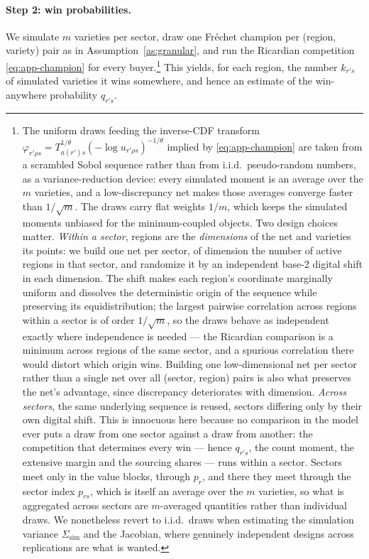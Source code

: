 \paragraph{Step 2: win probabilities.} We simulate $m$ varieties per sector, draw one Fr\'echet
champion per (region, variety) pair as in Assumption~\ref{as:granular}, and run the Ricardian
competition \eqref{eq:app-champion} for every buyer.\footnote{The uniform draws feeding the
inverse-CDF transform $\varphi_{r'\rho s}=T_{a(r')s}^{1/\theta}(-\log u_{r'\rho s})^{-1/\theta}$
implied by \eqref{eq:app-champion} are taken from a scrambled Sobol sequence rather than from
i.i.d.\ pseudo-random numbers, as a variance-reduction device: every simulated moment is an
average over the $m$ varieties, and a low-discrepancy net makes those averages converge faster
than $1/\sqrt{m}$. The draws carry flat weights $1/m$, which keeps the simulated moments
unbiased for the minimum-coupled objects. Two design choices matter. \emph{Within a sector},
regions are the \emph{dimensions} of the net and varieties its points: we build one net per
sector, of dimension the number of active regions in that sector, and randomize it by an
independent base-2 digital shift in each dimension. The shift makes each region's coordinate
marginally uniform and dissolves the deterministic origin of the sequence while preserving its
equidistribution; the largest pairwise correlation across regions within a sector is of order
$1/\sqrt{m}$, so the draws behave as independent exactly where independence is needed --- the
Ricardian comparison is a minimum across regions of the same sector, and a spurious correlation
there would distort which origin wins. Building one low-dimensional net per sector rather than a
single net over all (sector, region) pairs is also what preserves the net's advantage, since
discrepancy deteriorates with dimension. \emph{Across sectors}, the same underlying sequence is
reused, sectors differing only by their own digital shift. This is innocuous here because no
comparison in the model ever puts a draw from one sector against a draw from another: the
competition that determines every win --- hence $q_{r's}$, the count moment, the extensive
margin and the sourcing shares --- runs within a sector. Sectors meet only in the value blocks,
through $p_{r}$, and there they meet through the sector index $p_{rs}$, which is itself an
average over the $m$ varieties, so what is aggregated across sectors are $m$-averaged quantities
rather than individual draws. We nonetheless revert to i.i.d.\ draws when estimating the
simulation variance $\Sigma_{\mathrm{sim}}$ and the Jacobian, where genuinely independent
designs across replications are what is wanted.} This yields, for each region, the number
$k_{r's}$ of simulated varieties it wins somewhere, and hence an estimate of the win-anywhere
probability $q_{r's}$.

